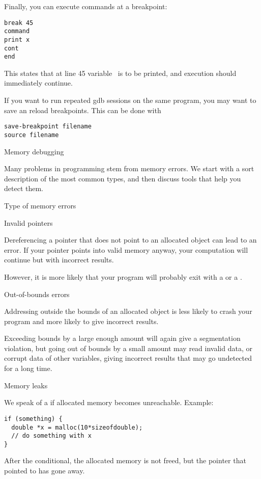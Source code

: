 Finally, you can execute commands at a breakpoint:
\begin{verbatim}
break 45
command
print x
cont
end
\end{verbatim}
This states that at line 45 variable~ is to be printed, and execution
should immediately continue.

If you want to run repeated gdb sessions on the same program,
you may want to save an reload breakpoints. This can be done with
\begin{verbatim}
save-breakpoint filename
source filename
\end{verbatim}


 {Memory debugging}

Many problems in programming stem from memory errors. We start with a
sort description of the most common types, and then discuss tools that
help you detect them.

 {Type of memory errors}

 {Invalid pointers}

Dereferencing a pointer that does not point to an allocated object can lead to an error.
If your pointer points into valid memory anyway, your computation will continue but with incorrect results.

However, it is more likely that
your program will probably exit with a
 or a .

 {Out-of-bounds errors}

Addressing outside the bounds of an allocated object is less likely to crash your program and more likely to give incorrect results.

Exceeding bounds by a large enough amount will again give a
segmentation violation, but going out of bounds by a small amount may
read invalid data, or corrupt data of other variables, giving
incorrect results that may go undetected for a long time.

 {Memory leaks}

We speak of a  if allocated memory becomes unreachable.
Example:
\begin{lstlisting}
if (something) {
  double *x = malloc(10*sizeofdouble);
  // do something with x
}
\end{lstlisting}
After the conditional, the allocated memory is not freed, but the
pointer that pointed to has gone away.

